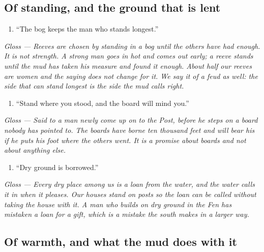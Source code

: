 \documentclass{design/chronicle}
\begin{document}
\subsection*{Of standing, and the ground that is lent}

\begin{enumerate}[leftmargin=1.4em,itemsep=1pt,topsep=3pt,parsep=0pt]

\item “The bog keeps the man who stands longest.”

\end{enumerate}

\emph{Gloss — Reeves are chosen by standing in a bog until the others have had enough. It is not strength. A strong man goes in hot and comes out early; a reeve stands until the mud has taken his measure and found it enough. About half our reeves are women and the saying does not change for it. We say it of a feud as well: the side that can stand longest is the side the mud calls right.}

\begin{enumerate}[leftmargin=1.4em,itemsep=1pt,topsep=3pt,parsep=0pt]

\item “Stand where you stood, and the board will mind you.”

\end{enumerate}

\emph{Gloss — Said to a man newly come up on to the Post, before he steps on a board nobody has pointed to. The boards have borne ten thousand feet and will bear his if he puts his foot where the others went. It is a promise about boards and not about anything else.}

\begin{enumerate}[leftmargin=1.4em,itemsep=1pt,topsep=3pt,parsep=0pt]

\item “Dry ground is borrowed.”

\end{enumerate}

\emph{Gloss — Every dry place among us is a loan from the water, and the water calls it in when it pleases. Our houses stand on posts so the loan can be called without taking the house with it. A man who builds on dry ground in the Fen has mistaken a loan for a gift, which is a mistake the south makes in a larger way.}

\subsection*{Of warmth, and what the mud does with it}
\end{document}
